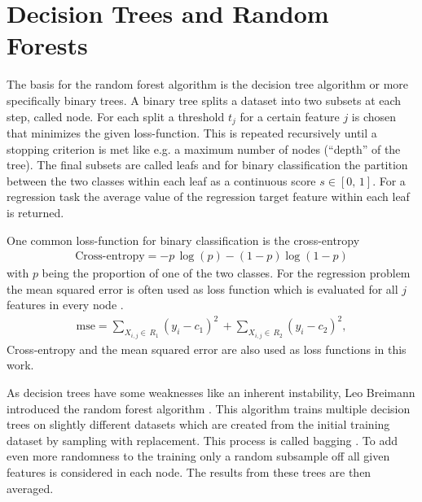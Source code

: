 \section{Decision Trees and Random Forests}
The basis for the random forest algorithm is the decision tree algorithm \cite{breiman1984classification} or more specifically binary trees.
A binary tree splits a dataset into two subsets at each step, called node.
For each split a threshold $t_j$ for a certain feature $j$ is chosen that minimizes the given loss-function.
This is repeated recursively until a stopping criterion is met like e.g. a maximum number of nodes (\enquote{depth} of the tree). 
The final subsets are called leafs and for binary classification the partition between the two classes within each leaf as a continuous score $s \in [0,\, 1]$.
For a regression task the average value of the regression target feature within each leaf is returned.

One common loss-function for binary classification is the cross-entropy
\begin{align}
    \text{Cross-entropy} = - p\, \log(p) - (1 - p) \log(1-p)
\end{align}
with $p$ being the proportion of one of the two classes.
For the regression problem the mean squared error is often used as loss function which is evaluated for all $j$ features in every node \cite{hastie2009elements}.
\begin{align}
    \text{mse} = \sum_{X_{i,j} \in\, R_1} (y_i - c_1)^2\, + \sum_{X_{i,j} \in\, R_2} (y_i - c_2)^2,
\end{align}
Cross-entropy and the mean squared error are also used as loss functions in this work.

As decision trees have some weaknesses like an inherent instability, Leo Breimann introduced the random forest algorithm \cite{breiman2001random}. 
This algorithm trains multiple decision trees on slightly different datasets which are created from the initial training dataset by sampling with replacement.
This process is called bagging \cite{breiman1996bagging}.
To add even more randomness to the training only a random subsample off all given features is considered in each node. 
The results from these trees are then averaged.


